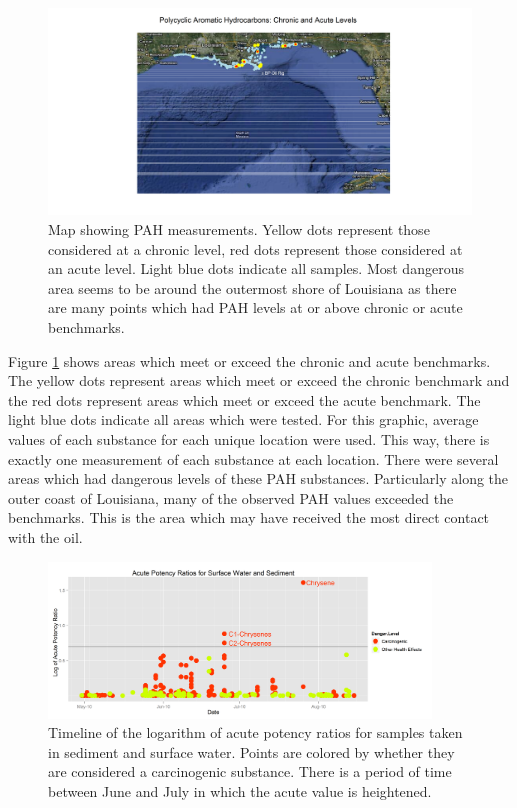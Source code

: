 \documentclass[11pt]{article}
\begin{document}
\begin{figure}[htbp] %
   \centering
   \includegraphics[width=5in]{chron-acute-map.png} 
   \caption{Map showing PAH measurements. Yellow dots represent those considered at a chronic level, red dots represent those considered at an acute level.  Light blue dots indicate all samples.  Most dangerous area seems to be around the outermost shore of Louisiana as there are many points which had PAH levels at or above chronic or acute benchmarks.}
   \label{pah-map}
\end{figure}


Figure \ref {pah-map} shows areas which meet or exceed the chronic and acute benchmarks.  The yellow dots represent areas which meet or exceed the chronic benchmark and the red dots represent areas which meet or exceed the acute benchmark.  The light blue dots indicate all areas which were tested.  For this graphic, average values of each substance for each unique location were used.  This way, there is exactly one measurement of each substance at each location.  There were several areas which had dangerous levels of these PAH substances.  Particularly along the outer coast of Louisiana, many of the observed PAH values exceeded the benchmarks.  This is the area which may have received the most direct contact with the oil.  


\begin{figure}[htbp] %
   \centering
   \includegraphics[width=4in]{acute-timeline3.png}  
   \caption{Timeline of the logarithm of acute potency ratios for samples taken in sediment and surface water.  Points are colored by whether they are considered a carcinogenic substance.  There is a period of time between June and July in which the acute value is heightened.}
   \label{pah-timeline}
\end{figure}
\end{document}

